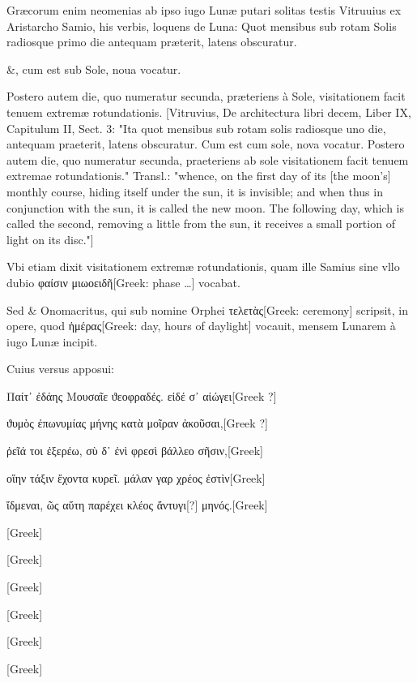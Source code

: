 \begin{parnumbers}

Græcorum enim neomenias ab ipso iugo Lunæ putari solitas testis Vitruuius ex Aristarcho Samio, his verbis, loquens de Luna: Quot mensibus sub rotam Solis radiosque primo die  antequam præterit, latens obscuratur.

\&, cum est sub Sole, noua vocatur.

Postero autem die, quo numeratur secunda, præteriens à Sole, visitationem facit tenuem extremæ rotundationis. [Vitruvius, De architectura libri decem, Liber IX, Capitulum II, Sect. 3: "Ita quot mensibus sub rotam solis radiosque uno die, antequam praeterit, latens obscuratur. Cum est cum sole, nova vocatur. Postero autem die, quo numeratur secunda, praeteriens ab sole visitationem facit tenuem extremae rotundationis." Transl.: "whence, on the first day of its [the moon's] monthly course, hiding itself under the sun, it is invisible; and when thus in conjunction with the sun, it is called the new moon. The following day, which is called the second, removing a little from the sun, it receives a small portion of light on its disc."]

Vbi etiam dixit visitationem extremæ rotundationis, quam ille Samius sine vllo dubio \textgreek{φαίσιν μιωοειδῆ[Greek: phase …]} vocabat.

Sed \& Onomacritus, qui sub nomine Orphei \textgreek{τελετὰς[Greek: ceremony]} scripsit, in opere, quod \textgreek{ἡμέρας[Greek: day, hours of daylight]} vocauit, mensem Lunarem à iugo Lunæ incipit.

Cuius versus apposui:

\begin{greek}
Παίτ᾽ ἐδάης Μουσαῖε ϑεοφραδἐς. εἰδέ σ᾽ αἰώγει[Greek ?]

ϑυμὸς ἐπωνυμίας μήνης κατὰ μοῖραν ἀκοῦσαι,[Greek ?]

ῤεῖά τοι ἐξερέω, σὺ δ᾽ ἐνὶ φρεσὶ βάλλεο σῆσιν,[Greek] 

οἵην τάξιν ἔχοντα κυρεῖ. μάλαν γαρ χρέος ἐστὶν[Greek]

ἴδμεναι, ῶς αὕτη παρέχει κλέος ἄντυγι[?] μηνός.[Greek]

\textgreek{[Greek]}

\textgreek{[Greek]}

\textgreek{[Greek]}

\textgreek{[Greek]}

\textgreek{[Greek]}

\textgreek{[Greek]}
\end{greek}


\end{parnumbers}

